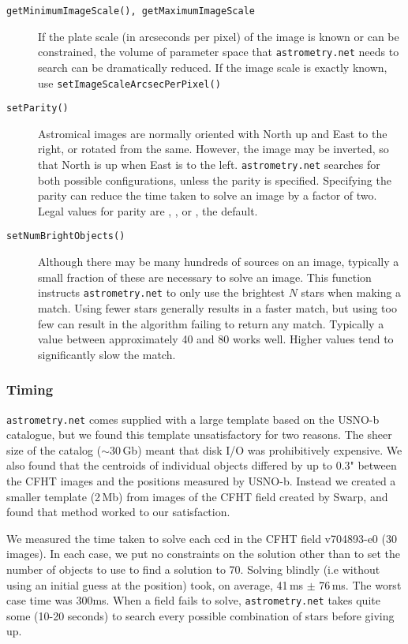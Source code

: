 \begin{description}
\item[{\tt getMinimumImageScale(), getMaximumImageScale}] If the plate scale (in arcseconds per pixel) of the image is known or can be constrained, the volume of parameter space that {\tt astrometry.net} needs to search can be dramatically reduced. If the image scale is exactly known, use {\tt setImageScaleArcsecPerPixel()}

\item[{\tt setParity()}] Astromical images are normally oriented with North up and East to the right, or rotated from the same. However, the image may be inverted, so that North is up when East is to the left. {\tt astrometry.net} searches for both possible configurations, unless the parity is specified. Specifying the parity can reduce the time taken to solve an image by a factor of two. Legal values for parity are , , or , the default.

\item[{\tt setNumBrightObjects()}] Although there may be many hundreds of sources on an image, typically a small fraction of these are necessary to solve an image. This function instructs {\tt astrometry.net} to only use the brightest $N$ stars when making a match. Using fewer stars generally results in a faster match, but using too few can result in the algorithm failing to return any match. Typically a value between approximately 40 and 80 works well. Higher values tend to significantly slow the match. 
\end{description}

\subsubsection{Timing}

{\tt astrometry.net} comes supplied with a large template based on the
USNO-b catalogue, but we found this template unsatisfactory for two
reasons. The sheer size of the catalog ($\sim$30\,Gb) meant that disk
I/O was prohibitively expensive. We also found that the centroids of
individual objects differed by up to 0.3" between the CFHT images and
the positions measured by USNO-b. Instead we created a smaller
template (2\,Mb) from images of the CFHT field created by Swarp, and
found that method worked to our satisfaction.

We measured the time taken to solve each ccd in the CFHT field
v704893-e0 (30 images). In each case, we put no constraints on the
solution other than to set the number of objects to use to find a
solution to 70. Solving blindly (i.e without using an initial guess at
the position) took, on average, 41\,ms $\pm$ 76\,ms. The worst case
time was 300ms. When a field fails to solve, {\tt astrometry.net}
takes quite some (10-20 seconds) to search every possible combination
of stars before giving up.

